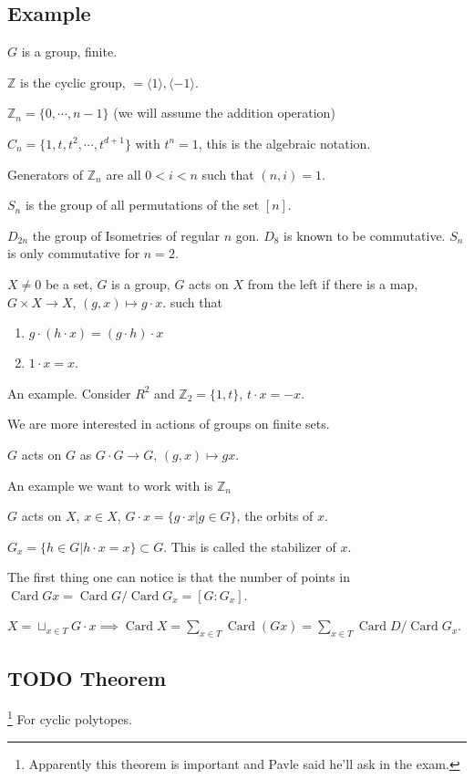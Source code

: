 \documentclass[11pt]{article}
\def\Z{\mathbb{Z}}
\def\card{\operatorname{Card}}
\begin{document}
{{\subsection{Example}
\label{sec:org49cbb63}
\(G\) is a group, finite.

\(\Z\) is the cyclic group, \(= \langle 1\rangle, \langle -1 \rangle\).

\(\Z_n = \{0, \cdots, n-1\}\) (we will assume the addition operation)

\(C_n = \{1, t, t^2, \cdots, t^{d+1}\}\) with \(t^n = 1\), this is the algebraic
notation.

Generators of \(\Z_n\) are all \(0 < i < n\) such that \((n, i) = 1\).

\(S_n\) is the group of all permutations of the set \([n]\).

\(D_{2n}\) the group of Isometries of regular \(n\) gon. \(D_{8}\) is known to be
commutative. \(S_n\) is only commutative for \(n = 2\).

\(X \neq 0\) be a set, \(G\) is a group, \(G\) acts on \(X\) from the left if there
is a map, \(G \times X \rightarrow X\), \((g, x) \mapsto g\cdot x\). such that

\begin{enumerate}
\item \(g \cdot (h \cdot x) = (g \cdot h) \cdot x\)
\item \(1 \cdot x = x\).
\end{enumerate}

An example. Consider \(R^2\) and \(\Z_2 = \{1, t\}\), \(t \cdot x = - x\).

We are more interested in actions of groups on finite sets.

\(G\) acts on \(G\) as \(G \cdot G \rightarrow G\), \((g, x) \mapsto gx\).

An example we want to work with is \(\Z_n\)

\(G\) acts on \(X\), \(x \in X\), \(G \cdot x = \{g \cdot x\vert g \in G\}\), the
orbits of \(x\).

\(G_x =\{h \in G \vert h \cdot x = x\} \subset G\). This is called the
stabilizer of \(x\).

The first thing one can notice is that the number of points in \(\card Gx =
   \card G / \card G_x = [G \colon G_x]\).

\(X = \sqcup_{x \in T} G \cdot x \implies \card X = \sum_{x \in T} \card(G x)
   = \sum_{x \in T} \card D/\card G_x\).
\subsection{{\bfseries\sffamily TODO} Theorem}
\label{sec:org09786b6}
\footnote{Apparently this theorem is important and Pavle said he'll ask in the
exam.} For cyclic polytopes.

}}
\end{document}
